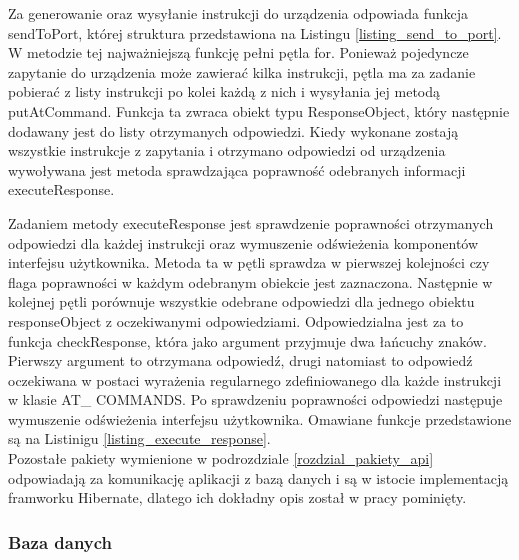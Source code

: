 \documentclass[12pt]{article} %
\numberwithin{equation}{subsection}
\numberwithin{figure}{section}
\numberwithin{table}{section}
\begin{document}
	Za generowanie oraz wysyłanie instrukcji do urządzenia odpowiada funkcja sendToPort, której struktura przedstawiona na Listingu \ref{listing_send_to_port}. W metodzie tej najważniejszą funkcję pełni pętla for. Ponieważ pojedyncze zapytanie do urządzenia może zawierać kilka instrukcji, pętla ma za zadanie pobierać z listy instrukcji po kolei każdą z nich i wysyłania jej metodą putAtCommand. Funkcja ta zwraca obiekt typu ResponseObject, który następnie dodawany jest do listy otrzymanych odpowiedzi. Kiedy wykonane zostają wszystkie instrukcje z zapytania i otrzymano odpowiedzi od urządzenia wywoływana jest metoda sprawdzająca poprawność odebranych informacji executeResponse. 
	\\
	
	
	
	\newpage
	
	Zadaniem metody executeResponse jest sprawdzenie poprawności otrzymanych odpowiedzi dla każdej instrukcji oraz wymuszenie odświeżenia komponentów interfejsu użytkownika. Metoda ta w pętli sprawdza w pierwszej kolejności czy flaga poprawności w każdym odebranym obiekcie 	jest zaznaczona. Następnie w kolejnej pętli porównuje wszystkie odebrane odpowiedzi dla jednego obiektu responseObject z oczekiwanymi odpowiedziami. Odpowiedzialna jest za to funkcja checkResponse, która jako argument przyjmuje dwa łańcuchy znaków. Pierwszy argument to otrzymana odpowiedź, drugi natomiast to odpowiedź oczekiwana w postaci wyrażenia regularnego zdefiniowanego dla każde instrukcji w klasie AT\_ COMMANDS. Po sprawdzeniu poprawności odpowiedzi następuje wymuszenie odświeżenia interfejsu użytkownika. Omawiane funkcje przedstawione są na Listinigu \ref{listing_execute_response}.
	\\
	
		
	
	Pozostałe pakiety wymienione w podrozdziale \ref{rozdzial_pakiety_api} odpowiadają za komunikację aplikacji z bazą danych i są w istocie implementacją framworku Hibernate, dlatego ich dokładny opis został w pracy pominięty.
	
	\newpage
	
	\subsubsection{Baza danych}
	
\end{document}
